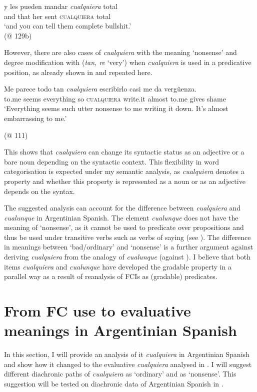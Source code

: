 \ea \label{ex:key:221} %
    \gll y  les  pueden  mandar  \textit{cualquiera} total\\
    and  that  her  sent  \textsc{cualquiera} {total}\\
    \glt ‘and you can tell them complete bullshit.’\\
    (@ 129b)
\z

However, there are also cases of \textit{cualquiera} with the meaning ‘nonsense’ and degree modification with (\textit{tan, re} ‘very’) when \textit{cualquiera} is used in a predicative position, as already shown in  and repeated here.

\ea \label{ex:key:222}
\gll Me parece todo tan \textit{cualquiera} escribirlo casi me da vergüenza.\\
to.me seems everything so \textsc{cualquiera} write.it almost to.me gives shame\\ 
\glt ‘Everything seems such utter nonsense to me writing it down. It’s almost embarrassing to me.’

(@ 111)
\z

This shows that \textit{cualquiera} can change its syntactic status as an adjective or a bare noun depending on the syntactic context. This flexibility in word categorisation is expected under my semantic analysis, as \textit{cualquiera} denotes a property and whether this property is represented as a noun or as an adjective depends on the syntax.

The suggested analysis can account for the difference between \textit{cualquiera} and \textit{cualunque} in Argentinian Spanish. The element \textit{cualunque} does not have the meaning of ‘nonsense’, as it cannot be used to predicate over propositions and thus be used under transitive verbs such as verbs of saying (see ). The difference in meanings between ‘bad/ordinary’ and ‘nonsense’ is a further argument against deriving \textit{cualquiera} from the analogy of \textit{cualunque} (against \citealt{Rizzosalierno2013}). I believe that both items \textit{cualquiera} and \textit{cualunque} have developed the gradable property in a parallel way as a result of reanalysis of FCIs as (gradable) predicates.

\section{From FC use to evaluative meanings in Argentinian Spanish}
\label{sec:4.5}

In this section, I will provide an analysis of it \textit{cualquiera} in Argentinian Spanish and show how it changed to the evaluative \textit{cualquiera} analysed in . I will suggest different diachronic paths of \textit{cualquiera} as ‘ordinary’ and as ‘nonsense’. This suggestion will be tested on diachronic data of Argentinian Spanish in .

